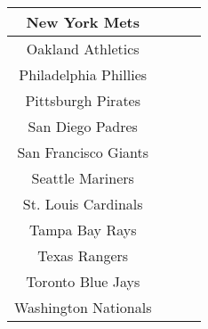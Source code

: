 \begin{center}
\begin{tabular}{|c|c|c|c|}
					\hline
					New York Mets	& & &	\\
					\hline
					Oakland Athletics	& & &	\\
					\hline
					Philadelphia Phillies	& & &	\\
					\hline
					Pittsburgh Pirates	& & &	\\
					\hline
					San Diego Padres	& & &	\\
					\hline
					San Francisco Giants	& & &	\\
					\hline
					Seattle Mariners	& & &	\\
					\hline
					St. Louis Cardinals	& & &	\\
					\hline
					Tampa Bay Rays	& & &	\\
					\hline
					Texas Rangers	& & &	\\
					\hline
					Toronto Blue Jays	& & &	\\
					\hline
					Washington Nationals	& & &	\\
					\hline
					
					
				\end{tabular}
			\end{center}
			
			
			
			
			
			\newpage
